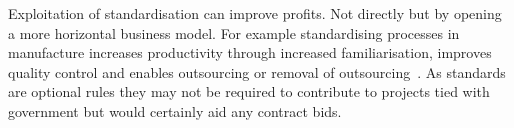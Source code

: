 Exploitation of standardisation can improve profits.
Not directly but by opening a more horizontal business model.
For example standardising processes in manufacture increases productivity through increased familiarisation, improves quality control and enables outsourcing or removal of outsourcing~\cite{pasquire2001standards}.
As standards are optional rules they may not be required to contribute to projects tied with government but would certainly aid any contract bids.

